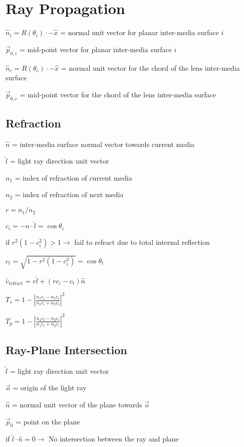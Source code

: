 \documentclass{article}
\begin{document}
\section{Ray Propagation}\label{sec:ray-propagation}
$\hat{n}_i = R(\theta_i) \cdot -\hat{x}$ = normal unit vector for planar inter-media surface $i$

$\vec{p}_{0, i}$ = mid-point vector for planar inter-media surface $i$

$\hat{n}_c = R(\theta_c) \cdot -\hat{x}$ = normal unit vector for the chord of the lens inter-media surface

$\vec{p}_{0, c}$ = mid-point vector for the chord of the lens inter-media surface


\subsection{Refraction}\label{subsec:refraction}
$\hat{n}$ = inter-media surface normal vector towards current media

$\hat{l}$ = light ray direction unit vector

$n_1$ = index of refraction of current media

$n_2$ = index of refraction of next media

$r = n_1 / n_2$

$c_i = -\hat{n} \cdot{} \hat{l} = \cos{\theta_i}$

if $r^2 (1 - c_i^2) > 1 \to$ fail to refract due to total internal reflection

$c_t = \sqrt{1 - r^2 (1 - c_i^2)} = \cos{\theta_t}$

$\hat{v}_{\text{refract}} = r \hat{l} + (r c_i - c_t) \hat{n}$

$T_{s} = 1 - | \frac{n_1 c_i - n_2 c_t}{n_1 c_i + n_2 c_t} |^2$

$T_{p} = 1 - | \frac{n_1 c_t - n_2 c_i}{n_1 c_t + n_2 c_i} |^2$

\subsection{Ray-Plane Intersection}\label{subsec:ray-plane-intersection}
$\hat{l}$ = light ray direction unit vector

$\vec{o}$ = origin of the light ray

$\hat{n}$ = normal unit vector of the plane towards $\vec{o}$

$\vec{p}_0$ = point on the plane

if $\hat{l} \cdot \hat{n} = 0 \to $ No intersection between the ray and plane
\end{document}
